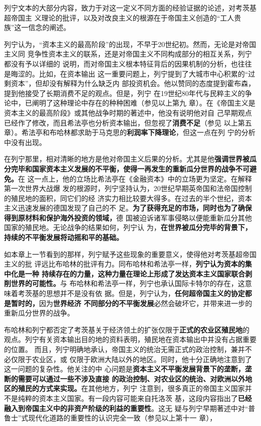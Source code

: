 列宁文本的大部分内容，致力于对这一定义不同方面的经验证据的论述，对考茨基超帝国主
义理论的批评，以及对改良主义的根源在于帝国主义创造的“工人贵族”这一信念的阐述。

列宁认为，“资本主义的最高阶段”的出现，不早于20世纪初。然而，无论是对帝国主义同
竞争性资本主义的联系，还是对帝国主义不同构成部分的相互关系，列宁都没有予以详细的
说明，而对帝国主义根本特征背后的因果机制的分析，也往往是晦涩的。比如，在资本输出
这一重要问题上，列宁提到了大城市中心积累的“过剩资本”，但却没有解释为什么缺乏内
部投资机会。他以赞同的态度提到霍布森，提到他接受了长期消费不足的观点。但是，列宁
在19世纪80年代与民粹主义的争论中，已阐明了这种理论中存在的种种困难（参见以上第九
章）。在《帝国主义是资本主义的最高阶段》或其他战争时期的著述中，他没有说明他对自
己早期观点已经作了修改，而且希法亭也分析资本输出，但忽视了\textbf{消费不足}（参见
以上第五章）。希法亭和布哈林都求助于马克思的\textbf{利润率下降理论}，但这一点在列
宁的分析中没有出现。

在列宁那里，相对清晰的地方是他对帝国主义后果的分析。尤其是他\textbf{强调世界被瓜
  分完毕和国家资本主义发展的不平衡，使得一再发生的重新瓜分世界的战争不可避免。}在
这一点上，他的立场比希法亭在《金融资本》中的立场更为坚定。在解释第一次世界大战爆
发的根源时，列宁坚持认为，20世纪早期英帝国和法帝国控制的殖民地的面积，同它们的经
济实力相比较要大得多。在过去的半个世纪，资本主义迅速发展的德国发现了自己的不
足。\textbf{为了获得充足的市场，同时也为了确保得到原材料和保护海外投资的领域，}德
国被迫诉诸军事侵略以便能重新瓜分其他国家的殖民地。无论战争的结果如何，列宁认
为，\textbf{在世界被瓜分完毕的背景下，持续的不平衡发展将动摇和平的基础。}

如本章上一节看到的那样，列宁赋予这些现象的重要意义，使得他对考茨基超帝国主义的批
评远比布哈林的批评有力。同布哈林和希法亭一样，\textbf{列宁认为资本的集中化是一种
  持续存在的力量，这种力量在理论上形成了发达资本主义国家联合剥削世界的可能性。}与
布哈林和希法亭一样，列宁也承认国际卡特尔的存在，这意味着考茨基的思想并不是没有依
据。但是，列宁认为，\textbf{任何超帝国主义的协定都是暂时的，}因为\textbf{世界经济
  不同部分的不平衡发展}必然会破坏它，并带来进一步的重新瓜分世界的战争。

布哈林和列宁都否定了考茨基关于经济领土的扩张仅限于\textbf{正式的农业区殖民地}的
观点。列宁有关资本输出目的地的资料表明，殖民地在资本输出中并没有占据重要的位置。
而且，列宁明确地承认，帝国主义的统治无需正式的政治控制，兼并不必仅限于农业区，或
仅限于欧洲大陆以外的地区。同时，他十分正确地注意到了这一问题的复杂性。他关注的中
心问题是\textbf{资本主义不平衡发展背景下的垄断，垄断的需要可以通过一些不涉及直接
的政治控制、对农业区的统治、对欧洲以外地区的殖民的方式来实现。}在其他地方，列宁
注意到，很多真正的帝国主义国家并不是纯粹的资本主义国家。有一段内容可能来自托洛茨
基，这段内容指出了\textbf{已经融入到帝国主义中的非资产阶级的利益的重要性}。这无
疑与列宁早期著述中对“普鲁士”式现代化道路的重要性的认识完全一致（参见以上第十一
章），

